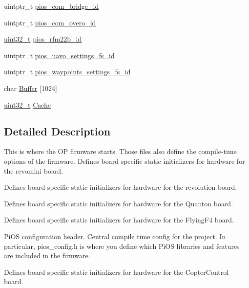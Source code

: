 \begin{DoxyCompactItemize}
\item 
uintptr\-\_\-t \hyperlink{group___open_pilot_core_gac040f05fa048688ee0269c2768698a14}{pios\-\_\-com\-\_\-bridge\-\_\-id}
\item 
uintptr\-\_\-t \hyperlink{group___open_pilot_core_ga048f2bb98de60944f135effb407a1139}{pios\-\_\-com\-\_\-overo\-\_\-id}
\item 
\hyperlink{stdint_8h_a435d1572bf3f880d55459d9805097f62}{uint32\-\_\-t} \hyperlink{group___open_pilot_core_ga1e0b7d2eb8b8640e07daa1f381780972}{pios\-\_\-rfm22b\-\_\-id}
\item 
uintptr\-\_\-t \hyperlink{group___open_pilot_core_gab060f441dd600b08386c0ca1b487217a}{pios\-\_\-uavo\-\_\-settings\-\_\-fs\-\_\-id}
\item 
uintptr\-\_\-t \hyperlink{group___open_pilot_core_ga4b04979e5fb31eaa66088178605835cd}{pios\-\_\-waypoints\-\_\-settings\-\_\-fs\-\_\-id}
\item 
char \hyperlink{group___open_pilot_core_gaaf1490d688e7cf0c41987d87572ff80a}{Buffer} \mbox{[}1024\mbox{]}
\item 
\hyperlink{stdint_8h_a435d1572bf3f880d55459d9805097f62}{uint32\-\_\-t} \hyperlink{group___open_pilot_core_gaef8c3e152589675df7f5b49cc1ba7ffd}{Cache}
\end{DoxyCompactItemize}


\subsection{Detailed Description}
This is where the O\-P firmware starts. Those files also define the compile-\/time options of the firmware. Defines board specific static initializers for hardware for the revomini board.

Defines board specific static initializers for hardware for the revolution board.

Defines board specific static initializers for hardware for the Quanton board.

Defines board specific static initializers for hardware for the Flying\-F4 board.

Pi\-O\-S configuration header. Central compile time config for the project. In particular, pios\-\_\-config.\-h is where you define which Pi\-O\-S libraries and features are included in the firmware.

Defines board specific static initializers for hardware for the Copter\-Control board.

